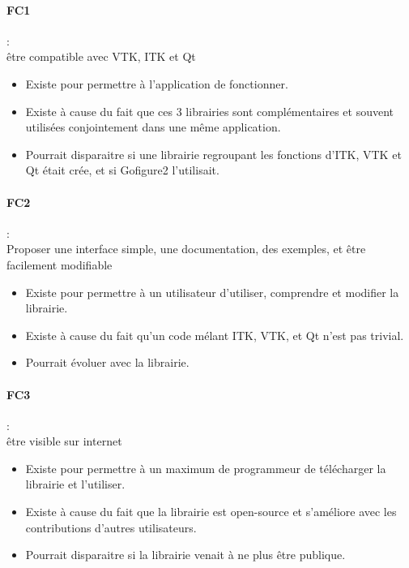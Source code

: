 \paragraph*{FC1} :\\ être compatible avec VTK, ITK et Qt
\begin{itemize}
  \item Existe pour permettre à l'application de fonctionner.
  \item Existe à cause du fait que ces 3 librairies sont complémentaires et souvent utilisées conjointement dans une même application.
  \item Pourrait disparaitre si une librairie regroupant les fonctions d'ITK, VTK et Qt était crée, et si Gofigure2 l'utilisait.
\end{itemize}

\paragraph*{FC2} :\\ Proposer une interface simple, une documentation, des exemples, et être facilement modifiable
\begin{itemize}
  \item Existe pour permettre à un utilisateur d'utiliser, comprendre et modifier la librairie.
  \item Existe à cause du fait qu'un code mélant ITK, VTK, et Qt n'est pas trivial.
  \item Pourrait évoluer avec la librairie.
\end{itemize}

\paragraph*{FC3} :\\ être visible sur internet
\begin{itemize}
  \item Existe pour permettre à un maximum de programmeur de télécharger la librairie et l'utiliser.
  \item Existe à cause du fait que la librairie est open-source et s'améliore avec les contributions d'autres utilisateurs.
  \item Pourrait disparaitre si la librairie venait à ne plus être publique.
\end{itemize}

